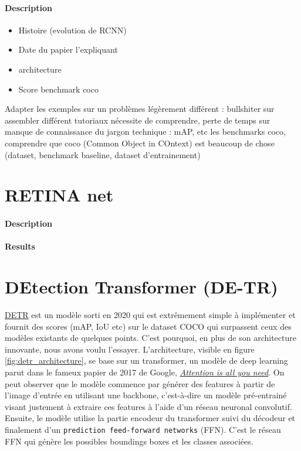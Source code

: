 \paragraph{Description}





\begin{itemize}
    \item Histoire (evolution de RCNN) 
    \item Date du papier l’expliquant 
    \item architecture
    \item Score benchmark coco
\end{itemize}
Adapter les exemples sur un problèmes légèrement différent : bullshiter sur assembler différent tutoriaux nécessite de comprendre, perte de temps sur manque de connaissance du jargon technique : mAP, etc les benchmarks coco, comprendre que coco (Common Object in COntext) est beaucoup de chose (dataset, benchmark baseline, dataset d’entrainement)





\section{RETINA net}
\paragraph{Description}

\paragraph{Results}








\section{DEtection Transformer (DE-TR)}

\href{https://github.com/facebookresearch/detr}{DETR} est un modèle sorti en 2020 qui est extrêmement simple à implémenter et fournit des scores (mAP, IoU etc) sur le dataset COCO qui surpassent ceux des modèles existants de quelques points. C’est pourquoi, en plus de son architecture innovante, nous avons voulu l’essayer. L’architecture, visible en figure \ref{fig:detr_architecture}, se base sur un transformer, un modèle de deep learning parut dans le fameux papier de 2017 de Google, \href{https://arxiv.org/pdf/1706.03762.pdf}{\textit{Attention is all you need}}. On peut observer que le modèle commence par générer des features à partir de l'image d'entrée en utilisant une backbone, c'est-à-dire un modèle pré-entrainé visant justement à extraire ces features à l'aide d'un réseau neuronal convolutif. Ensuite, le modèle utilise la partie encodeur du transformer suivi du décodeur et finalement d'un \verb|prediction feed-forward networks| (FFN). C'est le réseau FFN qui génère les possibles boundings boxes et les classes associées.

